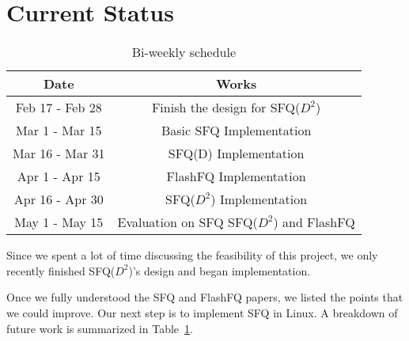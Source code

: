 \section{Current Status}

\begin{table}[t]
	\centering
	\tabcolsep=0.11cm
	\begin{tabular}{|c|c|}
		\hline
		Date & Works \\
		\hline
		Feb 17 - Feb 28 & Finish the design for SFQ($D^2$) \\
		\hline
		Mar 1 - Mar 15 & Basic SFQ Implementation \\
		\hline
		Mar 16 - Mar 31 & SFQ(D) Implementation \\
		\hline
		Apr 1 - Apr 15 & FlashFQ Implementation \\
		\hline
		Apr 16 - Apr 30 & SFQ($D^2$) Implementation \\
		\hline
		May 1 - May 15 & Evaluation on SFQ SFQ($D^2$) and FlashFQ\\
		\hline
	\end{tabular}
	\caption{Bi-weekly schedule}
	\vspace{-12pt}
	\label{table:traces}
\end{table}

Since we spent a lot of time discussing the feasibility of this
project, we only recently finished SFQ($D^2$)'s design and began
implementation.

Once we fully understood the SFQ and FlashFQ papers, we listed the
points that we could improve. Our next step is to implement SFQ in
Linux. A breakdown of future work is summarized in
Table~\ref{table:traces}.
